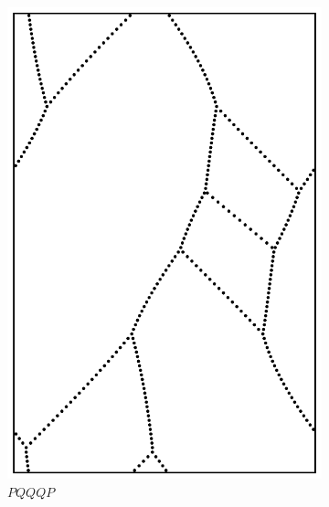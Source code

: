 \documentclass[12pt,twoside]{reedthesis}
\theoremstyle{definition}
\begin{document}
\begin{figure}[h]
\begin{subfigure}[t]{0.24\textwidth}
    \includegraphics[width=\textwidth]{figures/string_cheese_appendix/pqqqp.pdf}
    \caption*{$PQQQP$}
    \vspace{5mm}
  \end{subfigure}
  \hfill
  \begin{subfigure}[t]{0.24\textwidth}

\end{subfigure}
\end{figure}
\end{document}
